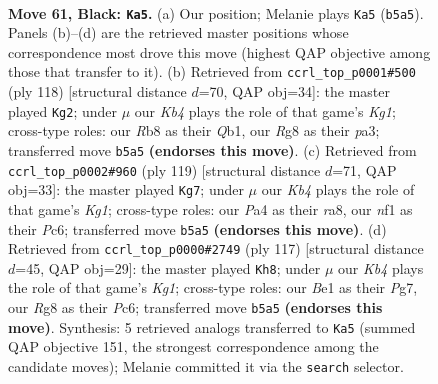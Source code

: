 \documentclass[11pt]{article}
\begin{document}
\clearpage

\begin{figure}[p]\centering
\begin{subfigure}{0.46\textwidth}\centering
\resizebox{\linewidth}{!}{%
\newchessgame
\chessboard[
  setfen={1r4r1/p5p1/4Q2p/1k1p3P/p2P2P1/1q2P3/7K/4bN2 b - - 31 61},
  showmover=false,
  pgfstyle=straightmove, color=movearrow, markmove={b5-a5}
]}
\caption{}
\end{subfigure}\hfill
\begin{subfigure}{0.46\textwidth}\centering
\resizebox{\linewidth}{!}{%
\newchessgame
\chessboard[
  setfen={3q4/1r3pk1/1P4p1/7p/3p3P/pR4P1/P4P2/1Q4K1 w - - 5 60},
  showmover=false,
  pgfstyle=straightmove, color=movearrow, markmove={g1-g2}
]}
\caption{}
\end{subfigure}
\\[4pt]
\begin{subfigure}{0.46\textwidth}\centering
\resizebox{\linewidth}{!}{%
\newchessgame
\chessboard[
  setfen={R5k1/3q1p2/2p1r1p1/7p/1P1p3P/3Q2P1/4PP2/5K2 b - - 62 60},
  showmover=false,
  pgfstyle=straightmove, color=movearrow, markmove={g8-g7}
]}
\caption{}
\end{subfigure}\hfill
\begin{subfigure}{0.46\textwidth}\centering
\resizebox{\linewidth}{!}{%
\newchessgame
\chessboard[
  setfen={4r1k1/3q2p1/pPp1pp2/P7/2Q2P2/1N5P/5P2/6K1 b - - 0 59},
  showmover=false,
  pgfstyle=straightmove, color=movearrow, markmove={g8-h8}
]}
\caption{}
\end{subfigure}
\caption{\textbf{Move 61, Black: \texttt{Ka5}.} (a) Our position; Melanie plays \texttt{Ka5} (\texttt{b5a5}). Panels (b)--(d) are the retrieved master positions whose correspondence most drove this move (highest QAP objective among those that transfer to it). (b) Retrieved from \texttt{ccrl\_top\_p0001\#500} (ply 118) [structural distance $d$=70, QAP obj=34]: the master played \texttt{Kg2}; under $\mu$ our \emph{Kb4} plays the role of that game's \emph{Kg1}; cross-type roles: our \emph{R}b8 as their \emph{Q}b1, our \emph{R}g8 as their \emph{p}a3; transferred move \texttt{b5a5} \textbf{(endorses this move)}. (c) Retrieved from \texttt{ccrl\_top\_p0002\#960} (ply 119) [structural distance $d$=71, QAP obj=33]: the master played \texttt{Kg7}; under $\mu$ our \emph{Kb4} plays the role of that game's \emph{Kg1}; cross-type roles: our \emph{P}a4 as their \emph{r}a8, our \emph{n}f1 as their \emph{P}c6; transferred move \texttt{b5a5} \textbf{(endorses this move)}. (d) Retrieved from \texttt{ccrl\_top\_p0000\#2749} (ply 117) [structural distance $d$=45, QAP obj=29]: the master played \texttt{Kh8}; under $\mu$ our \emph{Kb4} plays the role of that game's \emph{Kg1}; cross-type roles: our \emph{B}e1 as their \emph{P}g7, our \emph{R}g8 as their \emph{P}c6; transferred move \texttt{b5a5} \textbf{(endorses this move)}. Synthesis: 5 retrieved analogs transferred to \texttt{Ka5} (summed QAP objective 151, the strongest correspondence among the candidate moves); Melanie committed it via the \texttt{search} selector.}
\label{fig:thought-m121}
\end{figure}
\end{document}
